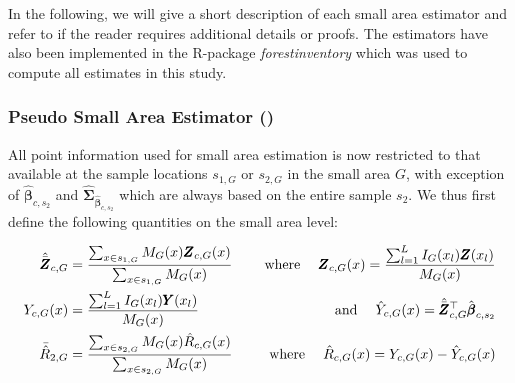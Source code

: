  In the following, we will give a short description of each small area estimator and refer to \citet{mandallaz2013a, mandallaz2016, mandallaz2013b} if the reader requires additional details or proofs. The estimators have also been implemented in the R-package \textit{forestinventory} \citep{forestinventory} which was used to compute all estimates in this study.\\



\subsubsection{Pseudo Small Area Estimator (\psmall{})}

All point information used for small area estimation is now restricted to that available at the sample locations $s_{1,G}$ or $s_{2,G}$ in the small area $G$, with exception of $\hat{\pmb{\beta}}_{c,s_2}$ and $\hat{\pmb{\Sigma}}_{\hat{\pmb{\beta}}_{c,s_2}}$ which are always based on the entire sample $s_2$. We thus first define the following quantities on the small area level:

\begin{subequations}\label{eq:compsG}
	\begin{align}
	\hat{\bar{\pmb{Z}}}_{c,G} &= \frac{\sum_{x \in s_{1,G}} M_{G}(x) \pmb{Z}_{c,G}(x)}{\sum_{x \in s_{1,G}} M_{G}(x)} \label{eq:meanZcG} \hspace{3ex} &\text{where} \hspace{3ex}
	\pmb{Z}_{c,G}(x) =  \frac{\sum_{l=1}^{L} I_{G}(x_l)\pmb{Z}(x_l)}{M_{G}(x)}\\		
	Y_{c,G}(x) &= \frac{\sum_{l=1}^{L} I_{G}(x_l)\pmb{Y}(x_l)}{M_{G}(x)}  &\text{and} \hspace{3ex}
	\hat{Y}_{c,G}(x)=\hat{\bar{\pmb{Z}}}_{c,G}^{\top}\hat{\pmb{\beta}}_{c,s_2}\\
	\bar{\hat{R}}_{2,G} &= \frac{\sum_{x \in s_{2,G}} M_{G}(x) \hat{R}_{c,G}(x)}{\sum_{x \in s_{2,G}} M_{G}(x)} \hspace{3ex} &\text{where} \hspace{3ex}
	\hat{R}_{c,G}(x) = Y_{c,G}(x)-\hat{Y}_{c,G}(x)
	\end{align}
\end{subequations}

